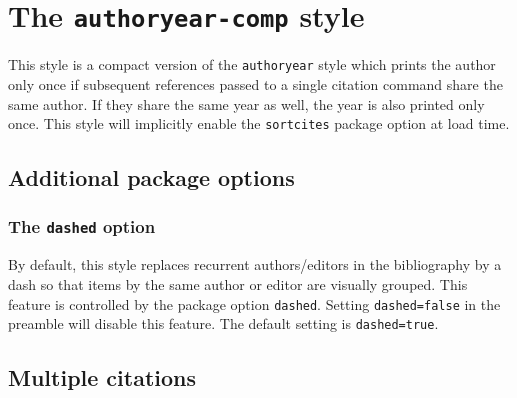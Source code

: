 \documentclass[a4paper]{article}
\begin{document}
\section*{The \texttt{authoryear-comp} style}

This style is a compact version of the \texttt{authoryear} style
which prints the author only once if subsequent references passed to
a single citation command share the same author. If they share the
same year as well, the year is also printed only once. This style
will implicitly enable the \texttt{sortcites} package option at load
time.

\subsection*{Additional package options}

\subsubsection*{The \texttt{dashed} option}

By default, this style replaces recurrent authors/editors in the
bibliography by a dash so that items by the same author or editor
are visually grouped. This feature is controlled by the package
option \texttt{dashed}. Setting \texttt{dashed=false} in the
preamble will disable this feature. The default setting is
\texttt{dashed=true}.

\subsection*{Multiple citations}

\cite{knuth:ct:c,aristotle:physics,knuth:ct:b,aristotle:poetics,aristotle:rhetoric,knuth:ct:d}

\clearpage
\printbibliography
\end{document}
